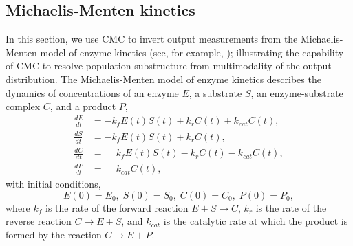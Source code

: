 \subsection{Michaelis-Menten kinetics}
In this section, we use CMC to invert output measurements from the Michaelis-Menten model of enzyme kinetics (see, for example, \cite{murray2007mathematical}); illustrating the capability of CMC to resolve population substructure from multimodality of the output distribution. The Michaelis-Menten model of enzyme kinetics describes the dynamics of concentrations of an enzyme $E$, a substrate $S$, an enzyme-substrate complex $C$, and a product $P$,
%
\begin{equation}\label{eq:michaelis_menten}
\begin{aligned}
\frac{dE}{dt} &= -k_f E(t)S(t) + k_r C(t) + k_{cat} C(t), \\
\frac{dS}{dt} &= -k_f E(t)S(t) + k_r C(t), \\
\frac{dC}{dt} &= \phantom{-}k_f E(t)S(t) - k_r C(t) - k_{cat} C(t), \\
\frac{dP}{dt} &= \phantom{-}k_{cat} C(t),
\end{aligned}
\end{equation}
%
with initial conditions,
\begin{equation}
E(0) = E_0, \; S(0)=S_0, \; C(0)=C_0, \; P(0)=P_0,
\end{equation}
%
where $k_f$ is the rate of the forward reaction $E+S \rightarrow C$, $k_r$ is the rate of the reverse reaction $C \rightarrow E+S$, and $k_{cat}$ is the catalytic rate at which the product is formed by the reaction $C \rightarrow E + P$.


